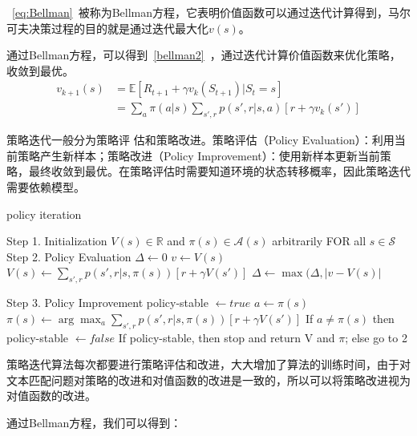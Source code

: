 ~\eqref{eq:Bellman}~被称为Bellman方程\cite{bellman1957markovian}，它表明价值函数可以通过迭代计算得到，马尔可夫决策过程的目的就是通过迭代最大化$v(s)$。

通过Bellman方程，可以得到~\eqref{bellman2}~，通过迭代计算价值函数来优化策略，收敛到最优。
\begin{equation}\label{bellman2}
\begin{aligned}
v_{k+1}(s) &= \mathbb{E}[R_{t+1}+\gamma v_k(S_{t+1})|S_t=s]\\
		   &= \sum_a \pi(a|s) \sum_{s',r}p(s',r|s,a)[r+\gamma v_k(s')]	
\end{aligned}		   
\end{equation}

策略迭代一般分为策略评 估和策略改进。策略评估（Policy Evaluation）：利用当前策略产生新样本；策略改进（Policy Improvement）：使用新样本更新当前策略，最终收敛到最优。在策略评估时需要知道环境的状态转移概率，因此策略迭代需要依赖模型。

\begin{algorithm}[H]
    \small
    \caption{policy iteration}\label{alg:policy_iteration}
    \begin{algorithmic}
        \STATE Step 1. Initialization
        	\STATE $V(s) \in \mathbb{R}$ and $\pi(s) \in \mathcal{A}(s)$ arbitrarily FOR all $s \in \mathcal{S}$
        \STATE Step 2. Policy Evaluation
        \REPEAT
        \STATE $\Delta \leftarrow 0$
        \STATE $v \leftarrow V(s)$
        \STATE $V(s)\leftarrow \sum_{s', r} p(s', r|s, \pi(s))[r + \gamma V(s')]$
        \STATE $\Delta \leftarrow \max(\Delta, |v-V(s)|$
        \ENDFOR

        \UNTIL{$\Delta < \theta$}

        \STATE Step 3. Policy Improvement
        \STATE policy-stable $\leftarrow  true$
        \STATE $a \leftarrow \pi(s)$
        \STATE $\pi(s) \leftarrow \arg\max_a\sum_{s', r}p(s', r|s, \pi(s))[r + \gamma V(s')]$
        \STATE If $a \neq \pi(s)$ then policy-stable $\leftarrow  false$
        \ENDFOR
        \STATE If policy-stable, then stop and return V and $\pi$; else go to 2
    \end{algorithmic}
\end{algorithm}

策略迭代算法每次都要进行策略评估和改进，大大增加了算法的训练时间，由于对文本匹配问题对策略的改进和对值函数的改进是一致的，所以可以将策略改进视为对值函数的改进。

通过Bellman方程，我们可以得到：

